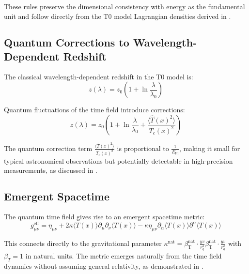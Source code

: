 \documentclass[12pt,a4paper]{article}
\newcommand{\betaT}{\beta_{\text{T}}}
\begin{document}
	These rules preserve the dimensional consistency with energy as the fundamental unit and follow directly from the T0 model Lagrangian densities derived in \cite{Pascher2025Fields}.
	
	\subsection{Quantum Corrections to Wavelength-Dependent Redshift}
	\label{subsec:quantum_redshift}
	
	The classical wavelength-dependent redshift in the T0 model is:
	\begin{equation}
		z(\lambda) = z_0\left(1 + \ln\frac{\lambda}{\lambda_0}\right)
		\label{eq:classical_redshift}
	\end{equation}
	
	Quantum fluctuations of the time field introduce corrections:
	\begin{equation}
		z(\lambda) = z_0\left(1 + \ln\frac{\lambda}{\lambda_0} + \frac{\langle \hat{T}(x)^2 \rangle}{T_c(x)^2}\right)
		\label{eq:quantum_redshift}
	\end{equation}
	
	The quantum correction term $\frac{\langle \hat{T}(x)^2 \rangle}{T_c(x)^2}$ is proportional to $\frac{1}{E_{\text{Pl}}}$, making it small for typical astronomical observations but potentially detectable in high-precision measurements, as discussed in \cite{Pascher2025Measurements}.
	
	\subsection{Emergent Spacetime}
	\label{subsec:emergent_spacetime}
	
	The quantum time field gives rise to an emergent spacetime metric:
	\begin{equation}
		g_{\mu\nu}^{\text{eff}} = \eta_{\mu\nu} + 2\kappa\langle T(x) \rangle \partial_{\mu}\partial_{\nu}\langle T(x) \rangle - \kappa\eta_{\mu\nu}\partial_{\alpha}\langle T(x) \rangle \partial^{\alpha}\langle T(x) \rangle
		\label{eq:emergent_metric}
	\end{equation}
	
	This connects directly to the gravitational parameter $\kappa^{\text{nat}} = \betaT^{\text{nat}} \cdot \frac{yv}{r_g^2}\betaT^{\text{nat}} \cdot \frac{yv}{r_g^2}$ with $\beta_T = 1$ in natural units. The metric emerges naturally from the time field dynamics without assuming general relativity, as demonstrated in \cite{Pascher2025EmergentGrav}.
	
\end{document}
